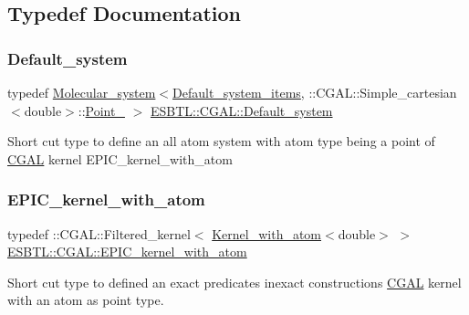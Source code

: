 \subsection{Typedef Documentation}
\mbox{\label{namespaceESBTL_1_1CGAL_a0d1fd18cc9360ce0ba0cc2ea2ed8be68}} 
\subsubsection{\texorpdfstring{Default\+\_\+system}{Default\_system}}
{\footnotesize\ttfamily typedef \hyperlink{classESBTL_1_1Molecular__system}{Molecular\+\_\+system}$<$\hyperlink{structESBTL_1_1Default__system__items}{Default\+\_\+system\+\_\+items}, \+::C\+G\+A\+L\+::\+Simple\+\_\+cartesian$<$double$>$\+::\hyperlink{classESBTL_1_1Point__3}{Point\+\_} $>$ \hyperlink{namespaceESBTL_1_1CGAL_a0d1fd18cc9360ce0ba0cc2ea2ed8be68}{E\+S\+B\+T\+L\+::\+C\+G\+A\+L\+::\+Default\+\_\+system}}

Short cut type to define an all atom system with atom type being a point of \hyperlink{namespaceESBTL_1_1CGAL}{C\+G\+AL} kernel E\+P\+I\+C\+\_\+kernel\+\_\+with\+\_\+atom \mbox{\label{namespaceESBTL_1_1CGAL_ac13df3c9add4e34942e608f17fb6971c}} 
\subsubsection{\texorpdfstring{E\+P\+I\+C\+\_\+kernel\+\_\+with\+\_\+atom}{EPIC\_kernel\_with\_atom}}
{\footnotesize\ttfamily typedef \+::C\+G\+A\+L\+::\+Filtered\+\_\+kernel$<$ \hyperlink{structESBTL_1_1CGAL_1_1Kernel__with__atom}{Kernel\+\_\+with\+\_\+atom}$<$double$>$ $>$ \hyperlink{namespaceESBTL_1_1CGAL_ac13df3c9add4e34942e608f17fb6971c}{E\+S\+B\+T\+L\+::\+C\+G\+A\+L\+::\+E\+P\+I\+C\+\_\+kernel\+\_\+with\+\_\+atom}}

Short cut type to defined an exact predicates inexact constructions \hyperlink{namespaceESBTL_1_1CGAL}{C\+G\+AL} kernel with an atom as point type.

